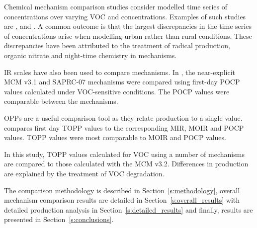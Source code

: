 Chemical mechanism comparison studies consider modelled time series of  concentrations over varying VOC and  concentrations. 
Examples of such studies are \citet{Dunker:1984}, \citet{Kuhn:1998} and \citet{Emmerson:2009}.
A common outcome is that the largest discrepancies in the time series of  concentrations arise when modelling urban rather than rural conditions.
These discrepancies have been attributed to the treatment of radical production, organic nitrate and night-time chemistry in mechanisms.

IR scales have also been used to compare mechanisms.
In \citet{Derwent:2010}, the near-explicit MCM v3.1 and SAPRC-07 mechanisms were compared using first-day POCP values calculated under VOC-sensitive conditions. 
The POCP values were comparable between the mechanisms. 

OPPs are a useful comparison tool as they relate  production to a single value. 
\citet{Butler:2011} compares first day TOPP values to the corresponding MIR, MOIR and POCP values.
TOPP values were most comparable to MOIR and POCP values.

In this study, TOPP values calculated for VOC using a number of mechanisms are compared to those calculated with the MCM v3.2. 
Differences in  production are explained by the treatment of VOC degradation.

The comparison methodology is described in \mbox{Section \ref{s:methodology}}, overall mechanism comparison results are detailed in \mbox{Section \ref{s:overall_results}} with detailed  production analysis in \mbox{Section \ref{s:detailed_results}} and finally, results are presented in \mbox{Section \ref{s:conclusions}}.
